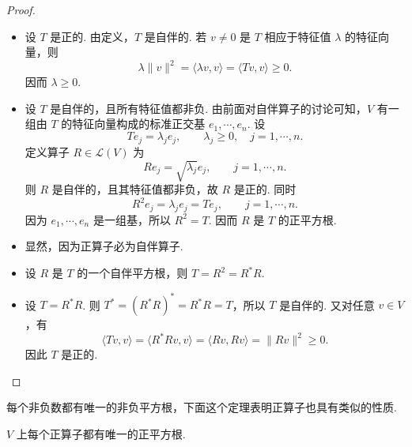 \begin{proof}
    \begin{itemize}
        \item[\ref*{item:25:正算子刻画:1}$\Rightarrow$\ref*{item:25:正算子刻画:2}] 设 $ T $ 是正的. 由定义，$ T $ 是自伴的. 若 $ v \neq 0 $ 是 $ T $ 相应于特征值 $ \lambda $ 的特征向量，则
        \[
            \lambda \| v \|^2 = \langle \lambda v, v \rangle = \langle Tv, v \rangle \geqslant 0.
        \]
        因而 $ \lambda \geqslant 0 $.

        \item[\ref*{item:25:正算子刻画:2}$\Rightarrow$\ref*{item:25:正算子刻画:3}] 设 $ T $ 是自伴的，且所有特征值都非负. 由前面对自伴算子的讨论可知，$ V $ 有一组由 $ T $ 的特征向量构成的标准正交基 $ e_1, \cdots, e_n $. 设
        \[
            T e_j = \lambda_j e_j, \qquad \lambda_j \geqslant 0, \quad j = 1, \cdots, n.
        \]
        定义算子 $ R \in \mathcal{L}(V) $ 为
        \[
            R e_j = \sqrt{\lambda_j} e_j, \qquad j = 1, \cdots, n.
        \]
        则 $ R $ 是自伴的，且其特征值都非负，故 $ R $ 是正的. 同时
        \[
            R^2 e_j = \lambda_j e_j = T e_j, \qquad j = 1, \cdots, n.
        \]
        因为 $ e_1, \cdots, e_n $ 是一组基，所以 $ R^2 = T $. 因而 $ R $ 是 $ T $ 的正平方根.

        \item[\ref*{item:25:正算子刻画:3}$\Rightarrow$\ref*{item:25:正算子刻画:4}] 显然，因为正算子必为自伴算子.

        \item[\ref*{item:25:正算子刻画:4}$\Rightarrow$\ref*{item:25:正算子刻画:5}] 设 $ R $ 是 $ T $ 的一个自伴平方根，则 $T = R^2 = R^* R$.

        \item[\ref*{item:25:正算子刻画:5}$\Rightarrow$\ref*{item:25:正算子刻画:1}] 设 $ T = R^* R $. 则 $T^* = (R^* R)^* = R^* R = T$，所以 $ T $ 是自伴的. 又对任意 $ v \in V $，有
        \[
            \langle Tv, v \rangle = \langle R^* Rv, v \rangle = \langle Rv, Rv \rangle = \| Rv \|^2 \geqslant 0.
        \]
        因此 $ T $ 是正的.
    \end{itemize}
\end{proof}

每个非负数都有唯一的非负平方根，下面这个定理表明正算子也具有类似的性质.

\begin{theorem}{}{}
    $ V $ 上每个正算子都有唯一的正平方根.
\end{theorem}

